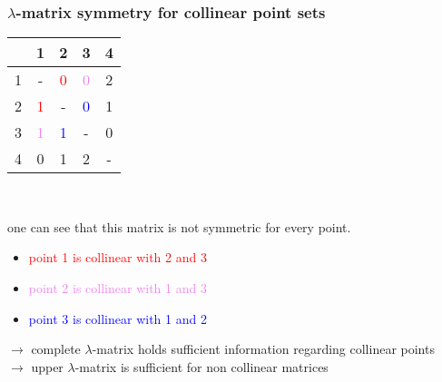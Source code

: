 \documentclass{beamer}
\begin{document}
\begin{frame}
\frametitle{$\lambda$-matrix symmetry for collinear point sets}
\begin{center}
\begin{tabular}{| c || c | c | c | c |}
    & 1 & 2 & 3 & 4 \\
 \hline
  1 & - & \textcolor{red}{0} & \textcolor{violet}{0} & 2 \\
  2 & \textcolor{red}{1} & - & \textcolor{blue}{0} & 1 \\
  3 & \textcolor{violet}{1} & \textcolor{blue}{1} & - & 0 \\
  4 & 0 & 1 & 2 & - \\
\end{tabular}\\
\end{center}

one can see that this matrix is not symmetric for every point.
\begin{itemize}
\item \textcolor{red}{point 1 is collinear with 2 and 3}
\item \textcolor{violet}{point 2 is collinear with 1 and 3}
\item \textcolor{blue}{point 3 is collinear with 1 and 2}

\end{itemize}
$\rightarrow$ complete $\lambda$-matrix holds sufficient information regarding collinear points\\
$\rightarrow$ upper $\lambda$-matrix is sufficient for non collinear matrices

\end{frame}
\end{document}
